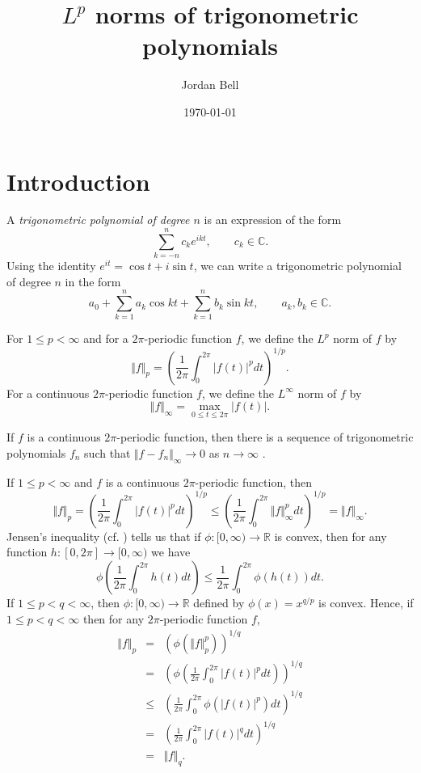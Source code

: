 \documentclass{article}
\newcommand{\norm}[1]{\Vert #1 \Vert}
\theoremstyle{definition}
\begin{document}
\title{$L^p$ norms of trigonometric polynomials}
\author{Jordan Bell}
\date{\today}

\maketitle

\section{Introduction}
A {\em trigonometric polynomial of degree $n$} is an expression  of the form
\[
\sum_{k=-n}^n c_k e^{ikt}, \qquad c_k \in \mathbb{C}.
\]
Using the identity $e^{it}=\cos t+i\sin t$, we can write a trigonometric polynomial of degree $n$ in the form
\[
a_0+\sum_{k=1}^n a_k \cos kt + \sum_{k=1}^n b_k \sin kt, \qquad a_k, b_k \in \mathbb{C}.
\]

For $1 \leq p < \infty$ and for a $2\pi$-periodic function $f$, we define the $L^p$ norm of $f$ by
\[
\norm{f}_p=\left(\frac{1}{2\pi} \int_0^{2\pi} |f(t)|^p dt \right)^{1/p}.
\]
For a continuous $2\pi$-periodic function $f$, we define the $L^\infty$ norm of $f$ by
\[
\norm{f}_\infty=\max_{0 \leq t \leq 2\pi} |f(t)|.
\] 


If $f$ is a continuous $2\pi$-periodic function, then there is a sequence of trigonometric polynomials $f_n$ such that
$\norm{f-f_n}_\infty \to 0$ as $n \to \infty$
\cite[p.~54, Corollary~5.4]{steinI}. 

If $1 \leq p < \infty$ and $f$ is a continuous $2\pi$-periodic function, then 
\[
\norm{f}_p = \left( \frac{1}{2\pi} \int_0^{2\pi} |f(t)|^p dt \right)^{1/p} \leq \left( \frac{1}{2\pi} \int_0^{2\pi} \norm{f}_\infty^p dt \right)^{1/p}= \norm{f}_\infty.
\]
Jensen's inequality \cite[p.~44, Theorem 2.2]{lieb} (cf. \cite[p.~113, Problem 7.5]{master}) tells us that if
$\phi:[0,\infty) \to \mathbb{R}$ is convex, then for any function $h:[0,2\pi] \to [0,\infty)$ we have
\[
\phi \left( \frac{1}{2\pi} \int_0^{2\pi} h(t) dt \right) \leq \frac{1}{2\pi} \int_0^{2\pi} \phi(h(t)) dt.
\]
If $1 \leq p < q < \infty$, then $\phi:[0,\infty) \to \mathbb{R}$ defined by $\phi(x)=x^{q/p}$ is convex. Hence, if $1 \leq p < q < \infty$ then for any $2\pi$-periodic function $f$,
\begin{eqnarray*}
\norm{f}_p&=&(\phi(\norm{f}_p^p))^{1/q}\\
&=&\left( \phi\left( \frac{1}{2\pi}\int_0^{2\pi} |f(t)|^p dt \right) \right)^{1/q}\\
&\leq&\left( \frac{1}{2\pi} \int_0^{2\pi} \phi(|f(t)|^p) dt \right)^{1/q}\\
&=&\left( \frac{1}{2\pi} \int_0^{2\pi} |f(t)|^q dt \right)^{1/q}\\
&=&\norm{f}_q.
\end{eqnarray*}
\end{document}
